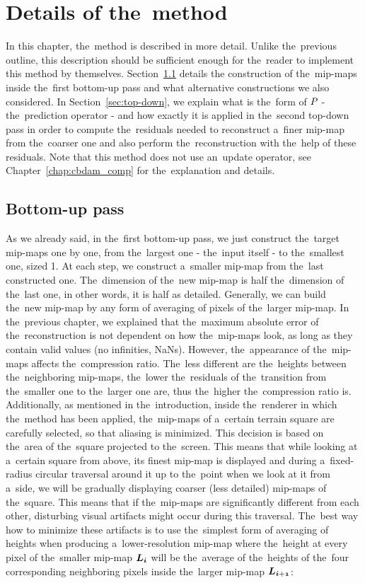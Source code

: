 \chapter{Details of the~method}\label{chap:details}

In this chapter, the~method is described in more detail. Unlike the~previous outline, this description should be sufficient enough for the~reader to implement this method by themselves. Section~\ref{sec:bottom-up} details the construction of the~mip-maps inside the~first bottom-up pass and what alternative constructions we also considered. In Section~\ref{sec:top-down}, we explain what is the~form of $\mathit{P_{}}$ - the~prediction operator - and how exactly it is applied in the~second top-down pass in order to compute the~residuals needed to reconstruct a~finer mip-map from the~coarser one and also perform the~reconstruction with the~help of these residuals. Note that this method does not use an~update operator, see Chapter~\ref{chap:cbdam_comp} for the~explanation and details.

\section{Bottom-up pass}\label{sec:bottom-up}
As we already said, in the~first bottom-up pass, we just construct the~target mip-maps one by one, from the~largest one - the~input itself - to the~smallest one, sized 1. At each step, we construct a~smaller mip-map from the~last constructed one. The~dimension of the~new mip-map is half the~dimension of the~last one, in other words, it is half as detailed. Generally, we can build the~new mip-map by any form of averaging of pixels of the~larger mip-map. In the~previous chapter, we explained that the~maximum absolute error of the~reconstruction is not dependent on how the~mip-maps look, as long as they contain valid values (no infinities, NaNs). However, the~appearance of the~mip-maps affects the~compression ratio. The~less different are the~heights between the~neighboring mip-maps, the~lower the~residuals of the~transition from the~smaller one to the~larger one are, thus the~higher the~compression ratio is. Additionally, as mentioned in the~introduction, inside the~renderer in which the~method has been applied, the~mip-maps of a~certain terrain square are carefully selected, so that aliasing is minimized. This decision is based on the~area of the~square projected to the~screen. This means that while looking at a~certain square from above, its finest mip-map is displayed and during a~fixed-radius circular traversal around it up to the~point when we look at it fro\textsl{}m a~side, we will be gradually displaying coarser (less detailed) mip-maps of the~square. This means that if the~mip-maps are significantly different from each other, disturbing visual artifacts might occur during this traversal. The~best way how to minimize these artifacts is to use the~simplest form of averaging of heights when producing a~lower-resolution mip-map where the~height at every pixel of the~smaller mip-map $\lnorm{i}$ will be the~average of the~heights of the~four corresponding neighboring pixels inside the~larger mip-map $\lnorm{i+1}$:

